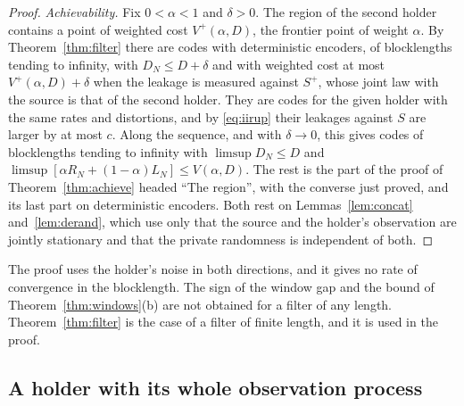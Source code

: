 \documentclass[11pt,onecolumn]{IEEEtran}
\begin{document}
\begin{proof}
\emph{Achievability.} Fix $0<\alpha<1$ and $\delta>0$. The region of the
second holder contains a point of weighted cost $V^+(\alpha,D)$, the
frontier point of weight $\alpha$. By Theorem~\ref{thm:filter} there are
codes with deterministic encoders, of blocklengths tending to infinity,
with $D_N\le D+\delta$ and with weighted cost at most
$V^+(\alpha,D)+\delta$ when the leakage is measured against $S^+$,
whose joint law with the source is that of the second holder. They
are codes for the given holder with the same rates and distortions, and
by \eqref{eq:iirup} their leakages against $S$ are larger by at most
$c$. Along the sequence, and with $\delta\to0$, this gives codes of
blocklengths tending to infinity with $\limsup D_N\le D$ and
$\limsup[\alpha R_N+(1-\alpha)L_N]\le V(\alpha,D)$. The rest is the part
of the proof of Theorem~\ref{thm:achieve} headed ``The region'', with
the converse just proved, and its last part on deterministic encoders.
Both rest on Lemmas~\ref{lem:concat} and~\ref{lem:derand}, which use
only that the source and the holder's observation are jointly
stationary and that the private randomness is independent of both.
\end{proof}

The proof uses the holder's noise in both directions, and it gives no
rate of convergence in the blocklength. The sign of the window gap and
the bound of Theorem~\ref{thm:windows}(b) are not obtained for a filter
of any length. Theorem~\ref{thm:filter} is the case of a filter of
finite length, and it is used in the proof.

\subsection{A holder with its whole observation process}
\label{sec:whole}
\end{document}

